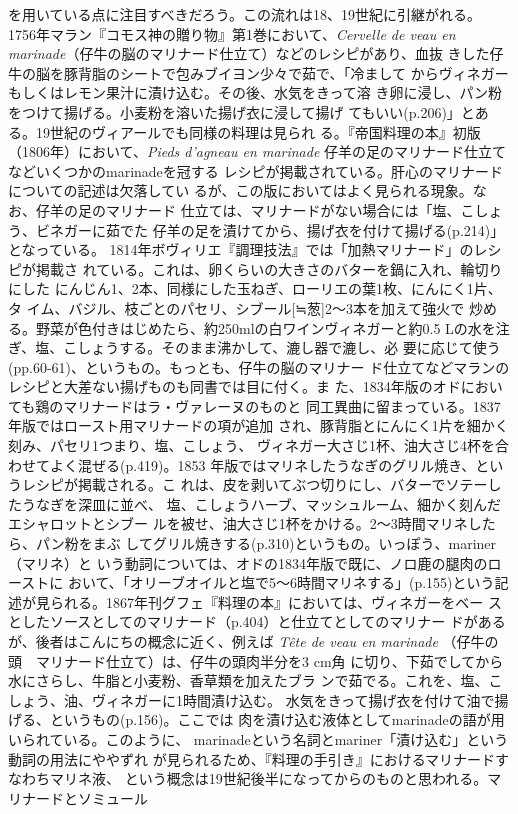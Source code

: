 {{{{  を用いている点に注目すべきだろう。この流れは18、19世紀に引継がれる。
  1756年マラン『コモス神の贈り物』第1巻において、\emph{Cervelle de veau
  en marinade}（仔牛の脳のマリナード仕立て）などのレシピがあり、血抜
  きした仔牛の脳を豚背脂のシートで包みブイヨン少々で茹で、「冷まして
  からヴィネガーもしくはレモン果汁に漬け込む。その後、水気をきって溶
  き卵に浸し、パン粉をつけて揚げる。小麦粉を溶いた揚げ衣に浸して揚げ
  てもいい(p.206)」とある。19世紀のヴィアールでも同様の料理は見られ
  る。『帝国料理の本』初版（1806年）において、\emph{Pieds d'agneau en
  marinade} 仔羊の足のマリナード仕立てなどいくつかのmarinadeを冠する
  レシピが掲載されている。肝心のマリナードについての記述は欠落してい
  るが、この版においてはよく見られる現象。なお、仔羊の足のマリナード
  仕立ては、マリナードがない場合には「塩、こしょう、ビネガーに茹でた
  仔羊の足を漬けてから、揚げ衣を付けて揚げる(p.214)」となっている。
  1814年ボヴィリエ『調理技法』では「加熱マリナード」のレシピが掲載さ
  れている。これは、卵くらいの大きさのバターを鍋に入れ、輪切りにした
  にんじん1、2本、同様にした玉ねぎ、ローリエの葉1枚、にんにく1片、タ
  イム、バジル、枝ごとのパセリ、シブール{[}≒葱{]}2〜3本を加えて強火で
  炒める。野菜が色付きはじめたら、約250mlの白ワインヴィネガーと約0.5
  Lの水を注ぎ、塩、こしょうする。そのまま沸かして、漉し器で漉し、必
  要に応じて使う(pp.60-61)、というもの。もっとも、仔牛の脳のマリナー
  ド仕立てなどマランのレシピと大差ない揚げものも同書では目に付く。ま
  た、1834年版のオドにおいても鶏のマリナードはラ・ヴァレーヌのものと
  同工異曲に留まっている。1837年版ではロースト用マリナードの項が追加
  され、豚背脂とにんにく1片を細かく刻み、パセリ1つまり、塩、こしょう、
  ヴィネガー大さじ1杯、油大さじ4杯を合わせてよく混ぜる(p.419)。1853
  年版ではマリネしたうなぎのグリル焼き、というレシピが掲載される。こ
  れは、皮を剥いてぶつ切りにし、バターでソテーしたうなぎを深皿に並べ、
  塩、こしょうハーブ、マッシュルーム、細かく刻んだエシャロットとシブー
  ルを被せ、油大さじ1杯をかける。2〜3時間マリネしたら、パン粉をまぶ
  してグリル焼きする(p.310)というもの。いっぽう、mariner（マリネ）と
  いう動詞については、オドの1834年版で既に、ノロ鹿の腿肉のローストに
  おいて、「オリーブオイルと塩で5〜6時間マリネする」(p.155)という記
  述が見られる。1867年刊グフェ『料理の本』においては、ヴィネガーをベー
  スとしたソースとしてのマリナード（p.404）と仕立てとしてのマリナー
  ドがあるが、後者はこんにちの概念に近く、例えば \emph{Tête de veau en
  marinade} （仔牛の頭　マリナード仕立て）は、仔牛の頭肉半分を3 cm角
  に切り、下茹でしてから水にさらし、牛脂と小麦粉、香草類を加えたブラ
  ンで茹でる。これを、塩、こしょう、油、ヴィネガーに1時間漬け込む。
  水気をきって揚げ衣を付けて油で揚げる、というもの(p.156)。ここでは
  肉を漬け込む液体としてmarinadeの語が用いられている。このように、
  marinadeという名詞とmariner「漬け込む」という動詞の用法にややずれ
  が見られるため、『料理の手引き』におけるマリナードすなわちマリネ液、
  という概念は19世紀後半になってからのものと思われる。}}{マリナードとソミュール}}\label{marinades-et-saumucres}}

